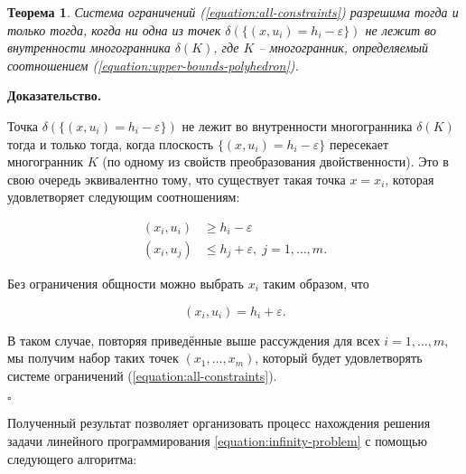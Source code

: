 \documentclass[a4paper, 10pt]{article}
\theoremstyle{definition}
\theoremstyle{plain}
\newtheorem{SmartTheorem}{Теорема}
\theoremstyle{plain}
\begin{document}
\begin{SmartTheorem}
 Система ограничений (\ref{equation:all-constraints}) разрешима тогда и только
 тогда, когда ни одна из точек
 $\delta(\{(x, u_{i}) = h_{i} - \varepsilon\})$ не лежит во внутренности
 многогранника $\delta(K)$, где $K$ -- многогранник, определяемый соотношением
 (\ref{equation:upper-bounds-polyhedron}).
\end{SmartTheorem}

\textbf{Доказательство.}

Точка $\delta(\{(x, u_{i}) = h_{i} - \varepsilon\})$ не лежит во внутренности
многогранника $\delta(K)$ тогда и только тогда, когда плоскость
$\{(x, u_{i}) = h_{i} - \varepsilon\}$ пересекает многогранник $K$ (по
одному из свойств преобразования двойственности). Это в свою очередь
эквивалентно тому, что существует такая точка $x = x_{i}$, которая удовлетворяет
следующим соотношениям:

\begin{align*}
 (x_{i}, u_{i}) & \geq h_{i} - \varepsilon \\
 (x_{i}, u_{j}) & \leq h_{j} + \varepsilon, \; j = 1, \ldots, m.
\end{align*}

Без ограничения общности можно выбрать $x_{i}$ таким образом, что

\begin{equation*}
(x_{i}, u_{i}) = h_{i} + \varepsilon.
\end{equation*}

В таком случае, повторяя
приведённые выше рассуждения для всех $i = 1, \ldots, m$, мы получим набор
таких точек $(x_{1}, \ldots, x_{m})$, который будет удовлетворять системе
ограничений (\ref{equation:all-constraints}).

$\square$

Полученный результат позволяет организовать процесс нахождения решения задачи
линейного программирования \ref{equation:infinity-problem} с помощью
следующего алгоритма:
\end{document}
